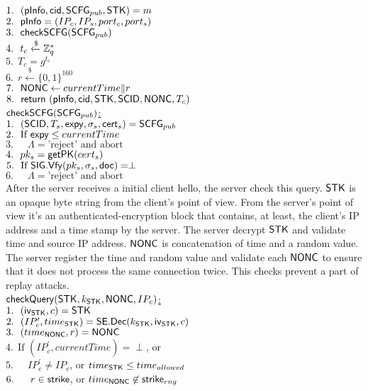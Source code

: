  $1.\ \ (\mathsf{pInfo}, \mathsf{cid}, \mathsf{SCFG}_{pub}, \mathsf{STK}) = m$ \\
 $2.\ \ \mathsf{pInfo} = (IP_c, IP_s, port_c, port_s)$ \\
 $3.\ \ \mathsf{checkSCFG}(\mathsf{SCFG}_{pub})$ \\
 $4.\ \ t_c \xleftarrow{\$} \mathbb{Z}_{q}^{\ast}$ \\
 $5.\ \ T_c = g^{t_c}$ \\
 $6.\ \ r \xleftarrow{\$} \{0,1\}^{160}$ \\
 $7.\ \ \mathsf{NONC} \leftarrow currentTime \| r$ \\
 $8.\ \ \mathsf{return}\ (\mathsf{pInfo}, \mathsf{cid}, \mathsf{STK}, \mathsf{SCID}, \mathsf{NONC}, T_c)$ \\
\underline{$\mathsf{checkSCFG}(\mathsf{SCFG}_{pub})$:} \\
 $1.\ \ (\mathsf{SCID}, T_s, \mathsf{expy}, \sigma_s, \mathsf{cert}_s) = \mathsf{SCFG}_{pub}$ \\
 $2.\ \ \text{If } \mathsf{expy} \leq currentTime$ \\
 $3.\ \ \quad \Lambda = \text{'reject' and abort}$ \\
 $4.\ \ pk_s = \mathsf{getPK}(cert_s)$ \\
 $5.\ \ \text{If } \mathsf{SIG}.\mathsf{Vfy}(pk_s, \sigma_s, \mathsf{doc}) = \perp$ \\
 $6.\ \ \quad \Lambda = \text{'reject' and abort}$ \\
%
After the server receives a initial client hello, the
server check this query. $\mathsf{STK}$ is an opaque byte string
from the client's point of view. From the server's point
of view it's an authenticated-encryption block that
contains, at least, the client's IP address and a time
stamp by the server. The server decrypt $\mathsf{STK}$ and
validate time and source IP address. $\mathsf{NONC}$ is
concatenation of time and a random value. The server
register the time and random value and validate each
$\mathsf{NONC}$ to ensure that it does not process the same
connection twice. This checks prevent a part of replay
attacks.
\\
\noindent
\underline{$\mathsf{checkQuery}(\mathsf{STK}, k_{\mathsf{STK}}, \mathsf{NONC}, IP_c)$:} \\
 $1.\ \ (\mathsf{iv}_{\mathsf{STK}}, c) = \mathsf{STK}$ \\
 $2.\ \ (IP_c^{\prime}, time_{\mathsf{STK}}) = \mathsf{SE}.\mathsf{Dec}(k_{\mathsf{STK}}, \mathsf{iv}_{\mathsf{STK}}, c)$ \\
 $3.\ \ (time_{\mathsf{NONC}}, r) = \mathsf{NONC}$ \\
 $4.\ \ \text{If } (IP_c^{\prime}, currentTime) = \perp$, or \\
 $5.\ \ \quad IP_c^{\prime} \neq IP_c$, or $time_{\mathsf{STK}} \leq time_{allowed}$\\
 $6.\ \ \quad r \in \mathsf{strike}$, or $time_{\mathsf{NONC}} \not\in \mathsf{strike}_{rng}$ \\
